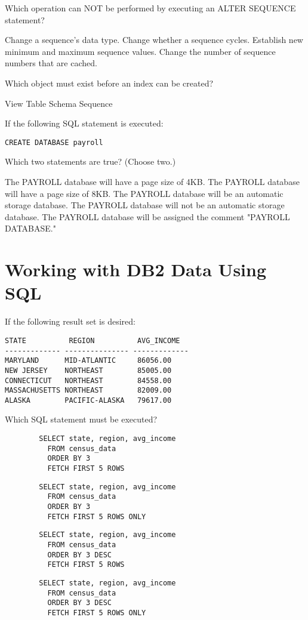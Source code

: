 \documentclass[11pt]{exam}
\begin{document}
\begin{questions}
\question[1]
Which operation can NOT be performed by executing an ALTER SEQUENCE statement?
\begin{choices}
\choice Change a sequence's data type.
\choice Change whether a sequence cycles.
\choice Establish new minimum and maximum sequence values.
\choice Change the number of sequence numbers that are cached.
\end{choices}

\question[1]
Which object must exist before an index can be created?
\begin{choices}
\choice View
\choice Table
\choice Schema
\choice Sequence
\end{choices}

\question[1]
If the following SQL statement is executed:
\begin{verbatim}
CREATE DATABASE payroll
\end{verbatim}
Which two statements are true? (Choose two.)
\begin{choices}
\choice The PAYROLL database will have a page size of 4KB.
\choice The PAYROLL database will have a page size of 8KB.
\choice The PAYROLL database will be an automatic storage database.
\choice The PAYROLL database will not be an automatic storage database.
\choice The PAYROLL database will be assigned the comment "PAYROLL DATABASE."
\end{choices}

\newpage
\section{Working with DB2 Data Using SQL}
\question[1]
If the following result set is desired:
\begin{verbatim}
STATE          REGION          AVG_INCOME
------------- --------------- -------------
MARYLAND      MID-ATLANTIC     86056.00
NEW JERSEY    NORTHEAST        85005.00
CONNECTICUT   NORTHEAST        84558.00
MASSACHUSETTS NORTHEAST        82009.00
ALASKA        PACIFIC-ALASKA   79617.00
\end{verbatim}
Which SQL statement must be executed?
\begin{choices}
\choice \begin{verbatim}
		SELECT state, region, avg_income
		  FROM census_data
		  ORDER BY 3
		  FETCH FIRST 5 ROWS
		\end{verbatim}
\choice \begin{verbatim}
		SELECT state, region, avg_income
		  FROM census_data
		  ORDER BY 3
		  FETCH FIRST 5 ROWS ONLY
	    \end{verbatim}
\choice \begin{verbatim}
		SELECT state, region, avg_income
		  FROM census_data
		  ORDER BY 3 DESC
		  FETCH FIRST 5 ROWS
		\end{verbatim}
\choice \begin{verbatim}
		SELECT state, region, avg_income
		  FROM census_data
		  ORDER BY 3 DESC
		  FETCH FIRST 5 ROWS ONLY
        \end{verbatim}
\end{choices}


\end{questions}
\end{document}
